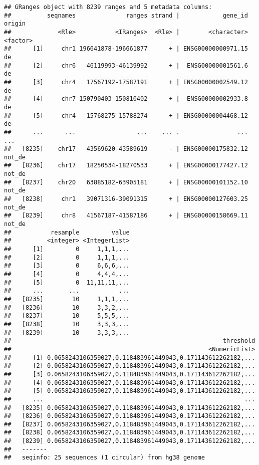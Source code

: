 \documentclass[
]{article}
\begin{document}
\begin{verbatim}
## GRanges object with 8239 ranges and 5 metadata columns:
##          seqnames              ranges strand |            gene_id   origin
##             <Rle>           <IRanges>  <Rle> |        <character> <factor>
##      [1]     chr1 196641878-196661877      + | ENSG00000000971.15       de
##      [2]     chr6   46119993-46139992      + |  ENSG00000001561.6       de
##      [3]     chr4   17567192-17587191      + | ENSG00000002549.12       de
##      [4]     chr7 150790403-150810402      + |  ENSG00000002933.8       de
##      [5]     chr4   15768275-15788274      + | ENSG00000004468.12       de
##      ...      ...                 ...    ... .                ...      ...
##   [8235]    chr17   43569620-43589619      - | ENSG00000175832.12   not_de
##   [8236]    chr17   18250534-18270533      + | ENSG00000177427.12   not_de
##   [8237]    chr20   63885182-63905181      + | ENSG00000101152.10   not_de
##   [8238]     chr1   39071316-39091315      + | ENSG00000127603.25   not_de
##   [8239]     chr8   41567187-41587186      + | ENSG00000158669.11   not_de
##           resample         value
##          <integer> <IntegerList>
##      [1]         0     1,1,1,...
##      [2]         0     1,1,1,...
##      [3]         0     6,6,6,...
##      [4]         0     4,4,4,...
##      [5]         0  11,11,11,...
##      ...       ...           ...
##   [8235]        10     1,1,1,...
##   [8236]        10     3,3,2,...
##   [8237]        10     5,5,5,...
##   [8238]        10     3,3,3,...
##   [8239]        10     3,3,3,...
##                                                           threshold
##                                                       <NumericList>
##      [1] 0.0658243106359027,0.118483961449043,0.171143612262182,...
##      [2] 0.0658243106359027,0.118483961449043,0.171143612262182,...
##      [3] 0.0658243106359027,0.118483961449043,0.171143612262182,...
##      [4] 0.0658243106359027,0.118483961449043,0.171143612262182,...
##      [5] 0.0658243106359027,0.118483961449043,0.171143612262182,...
##      ...                                                        ...
##   [8235] 0.0658243106359027,0.118483961449043,0.171143612262182,...
##   [8236] 0.0658243106359027,0.118483961449043,0.171143612262182,...
##   [8237] 0.0658243106359027,0.118483961449043,0.171143612262182,...
##   [8238] 0.0658243106359027,0.118483961449043,0.171143612262182,...
##   [8239] 0.0658243106359027,0.118483961449043,0.171143612262182,...
##   -------
##   seqinfo: 25 sequences (1 circular) from hg38 genome
\end{verbatim}
\end{document}
